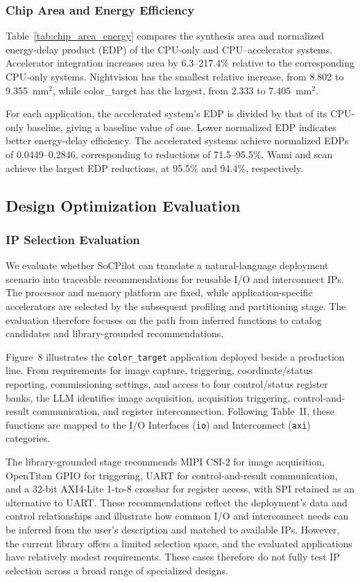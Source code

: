 \subsubsection{Chip Area and Energy Efficiency}
Table~\ref{tab:chip_area_energy} compares the synthesis area and normalized energy-delay product (EDP) of the CPU-only and CPU--accelerator systems. Accelerator integration increases area by 6.3--217.4\% relative to the corresponding CPU-only systems. Nightvision has the smallest relative increase, from 8.802 to 9.355~mm$^2$, while color\_target has the largest, from 2.333 to 7.405~mm$^2$.

For each application, the accelerated system's EDP is divided by that of its CPU-only baseline, giving a baseline value of one. Lower normalized EDP indicates better energy-delay efficiency. The accelerated systems achieve normalized EDPs of 0.0449--0.2846, corresponding to reductions of 71.5--95.5\%. Wami and scan achieve the largest EDP reductions, at 95.5\% and 94.4\%, respectively.



\subsection{Design Optimization Evaluation}
\subsubsection{IP Selection Evaluation}
We evaluate whether SoCPilot can translate a natural-language deployment scenario into traceable recommendations for reusable I/O and interconnect IPs. The processor and memory platform are fixed, while application-specific accelerators are selected by the subsequent profiling and partitioning stage. The evaluation therefore focuses on the path from inferred functions to catalog candidates and library-grounded recommendations.

Figure~8 illustrates the \texttt{color\_target} application deployed beside a production line. From requirements for image capture, triggering, coordinate/status reporting, commissioning settings, and access to four control/status register banks, the LLM identifies image acquisition, acquisition triggering, control-and-result communication, and register interconnection. Following Table~II, these functions are mapped to the I/O Interfaces (\texttt{io}) and Interconnect (\texttt{axi}) categories.

The library-grounded stage recommends MIPI CSI-2 for image acquisition, OpenTitan GPIO for triggering, UART for control-and-result communication, and a 32-bit AXI4-Lite 1-to-8 crossbar for register access, with SPI retained as an alternative to UART. These recommendations reflect the deployment's data and control relationships and illustrate how common I/O and interconnect needs can be inferred from the user's description and matched to available IPs. However, the current library offers a limited selection space, and the evaluated applications have relatively modest requirements. These cases therefore do not fully test IP selection across a broad range of specialized designs.

